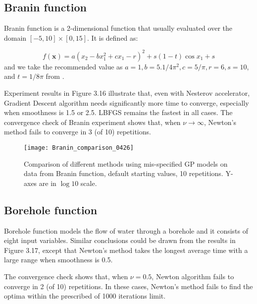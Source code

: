 \subsection{Branin function}
Branin function is a 2-dimensional function that usually evaluated over the domain $[-5,10]\times[0,15]$. It is defined as:

\begin{equation}
    f(\pmb{x}) = a(x_2 - bx_1^2 + cx_1 - r)^2 + s(1 - t) \cos{x_1} + s
\end{equation}
and we take the recommended value as $a = 1, b = 5.1/4\pi^2, c = 5/\pi, r = 6, s = 10$, and $t = 1/8\pi$ from \cite{simulationlib}.

Experiment results in Figure 3.16 illustrate that, even with Nesterov accelerator, Gradient Descent algorithm needs significantly more time to converge, especially when smoothness is 1.5 or 2.5. LBFGS remains the fastest in all cases. The convergence check of Branin experiment shows that, when $\nu\xrightarrow{} \infty$, Newton's method fails to converge in 3 (of 10) repetitions.

\begin{figure}[hbt!]%
  \centering
  \texttt{[image: Branin\_comparison\_0426]} %
  \caption[Times of Branin function: line graphs with range bars]%
  {Comparison of different methods using mis-specified GP models on data from Branin function, default starting values, 10 repetitions. Y-axes are in $\log 10$ scale.}%
  \label{fig:plotset}
\end{figure}

\subsection{Borehole function}
Borehole function models the flow of water through a borehole and it consists of eight input variables. Similar conclusions could be drawn from the results in Figure 3.17, except that Newton's method takes the longest average time with a large range when smoothness is 0.5. 

The convergence check shows that, when $\nu=0.5$, Newton algorithm fails to converge in 2 (of 10) repetitions. In these cases, Newton's method fails to find the optima within the prescribed of 1000 iterations limit.

